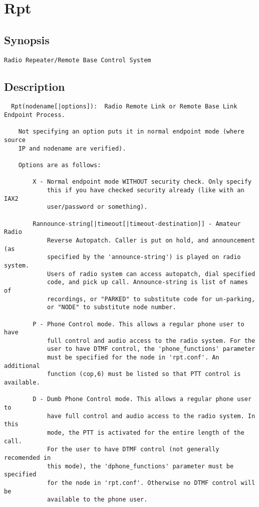 \section{Rpt}
\subsection{Synopsis}
\begin{verbatim}
Radio Repeater/Remote Base Control System
\end{verbatim}
\subsection{Description}
\begin{verbatim}
  Rpt(nodename[|options]):  Radio Remote Link or Remote Base Link Endpoint Process.

    Not specifying an option puts it in normal endpoint mode (where source
    IP and nodename are verified).

    Options are as follows:

        X - Normal endpoint mode WITHOUT security check. Only specify
            this if you have checked security already (like with an IAX2
            user/password or something).

        Rannounce-string[|timeout[|timeout-destination]] - Amateur Radio
            Reverse Autopatch. Caller is put on hold, and announcement (as
            specified by the 'announce-string') is played on radio system.
            Users of radio system can access autopatch, dial specified
            code, and pick up call. Announce-string is list of names of
            recordings, or "PARKED" to substitute code for un-parking,
            or "NODE" to substitute node number.

        P - Phone Control mode. This allows a regular phone user to have
            full control and audio access to the radio system. For the
            user to have DTMF control, the 'phone_functions' parameter
            must be specified for the node in 'rpt.conf'. An additional
            function (cop,6) must be listed so that PTT control is available.

        D - Dumb Phone Control mode. This allows a regular phone user to
            have full control and audio access to the radio system. In this
            mode, the PTT is activated for the entire length of the call.
            For the user to have DTMF control (not generally recomended in
            this mode), the 'dphone_functions' parameter must be specified
            for the node in 'rpt.conf'. Otherwise no DTMF control will be
            available to the phone user.


\end{verbatim}


